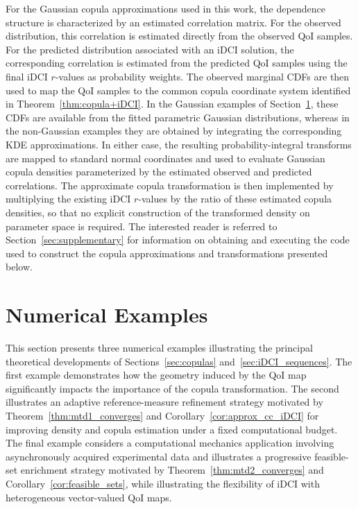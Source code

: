 \documentclass{article}
\newcounter{example}[section]
\begin{document}
For the Gaussian copula approximations used in this work, the dependence structure is characterized by an estimated correlation matrix.
For the observed distribution, this correlation is estimated directly from the observed QoI samples.
For the predicted distribution associated with an
iDCI solution, the corresponding correlation is estimated from the predicted QoI samples using the final iDCI $r$-values as probability weights.
The observed marginal CDFs are then used to map the QoI samples to the common copula coordinate system identified in Theorem~\ref{thm:copula+iDCI}.
In the Gaussian examples of Section~\ref{sec:numerics}, these CDFs are available from the fitted parametric Gaussian distributions, whereas in the non-Gaussian examples they are obtained by integrating the corresponding KDE approximations.
In either case, the resulting probability-integral transforms are mapped to standard normal coordinates and used to evaluate Gaussian copula densities parameterized by the estimated observed and predicted correlations.
The approximate copula transformation is then implemented by multiplying the existing iDCI $r$-values by the ratio of these estimated copula densities, so that no explicit construction of the transformed density on parameter space is required.
The interested reader is referred to Section~\ref{sec:supplementary} for information on obtaining and executing the code used to construct the copula approximations and transformations presented below.

\section{Numerical Examples}\label{sec:numerics}

This section presents three numerical examples illustrating the principal theoretical developments of Sections~\ref{sec:copulas} and~\ref{sec:iDCI_sequences}.
The first example demonstrates how the geometry induced by the QoI map significantly impacts the importance of the copula transformation.
The second illustrates an adaptive reference-measure refinement strategy motivated by Theorem~\ref{thm:mtd1_converges} and Corollary~\ref{cor:approx_cc_iDCI} for improving density and copula estimation under a fixed computational budget.
The final example considers a computational mechanics application involving asynchronously acquired experimental data and illustrates a progressive feasible-set enrichment strategy motivated by Theorem~\ref{thm:mtd2_converges} and Corollary~\ref{cor:feasible_sets}, while illustrating the flexibility of iDCI with heterogeneous vector-valued QoI maps.
\end{document}
